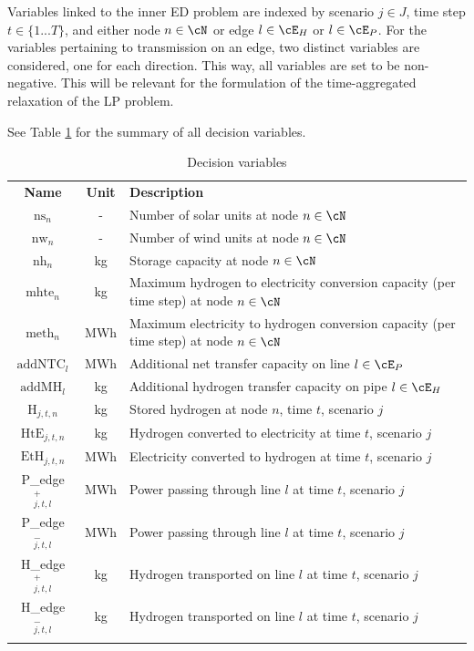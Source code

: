 \documentclass[smallextended,natbib]{svjour3}       %
\numberwithin{theorem}{section}
\begin{document}
Variables linked to the inner ED problem are indexed by scenario \(j\in J\), time step \(t\in\{1...T\}\), and either node \(n \in \cN\) or edge $l\in\cE_H$ or $l \in \cE_P$. 
For the variables pertaining to transmission on an edge, two distinct variables are considered, one for each direction. 
This way, all variables are set to be non-negative. This will be relevant for the formulation of the time-aggregated relaxation of the LP problem.

See Table \ref{table_vars} for the summary of all decision variables.

\begin{table}
  \caption{Decision variables}
  \label{table_vars}
  \begin{tabularx}{\textwidth}{ccl}
  \hline\noalign{\smallskip}
  \textbf{Name} & \textbf{Unit} & \textbf{Description}  \\
  \noalign{\smallskip}\hline\noalign{\smallskip}
  $\text{ns}_n$ & - & Number of solar units at node $n \in \cN$ \\
  $\text{nw}_n$ & - & Number of wind units at node $n \in \cN$ \\
  $\text{nh}_n$ & kg & Storage capacity at node $n \in \cN$\\
  $\text{mhte}_n$ & kg & \parbox[t]{0.70\textwidth}{Maximum hydrogen to electricity conversion capacity (per time step) at node $n \in \cN$} \\
  $\text{meth}_n$ & MWh &  \parbox[t]{0.70\textwidth}{Maximum electricity to hydrogen conversion capacity (per time step) at node $n \in \cN$} \\
  $\text{addNTC}_l$ & MWh & Additional net transfer capacity on line $l\in\cE_P$\\
  $\text{addMH}_l$ & kg & Additional hydrogen transfer capacity on pipe $l\in\cE_H$\\
  \noalign{\smallskip}\hline\noalign{\smallskip}
  $\text{H}_{j,t,n}$ & kg& Stored hydrogen at node $n$, time \(t\), scenario \(j\)\\
  $\text{HtE}_{j,t,n}$ & kg& Hydrogen converted to electricity at time \(t\), scenario \(j\) \\
  $\text{EtH}_{j,t,n}$ & MWh& Electricity converted to hydrogen at time \(t\), scenario \(j\)\\
  P\_edge$^+_{j,t,l}$&MWh& Power passing through line $l$ at time $t$, scenario $j$ \\
  P\_edge$^-_{j,t,l}$&MWh& Power passing through line $l$ at time $t$, scenario $j$ \\
  H\_edge$^+_{j,t,l}$&kg& Hydrogen transported on line $l$ at time $t$, scenario $j$\\
  H\_edge$^-_{j,t,l}$&kg& Hydrogen transported on line $l$ at time $t$, scenario $j$\\
  \noalign{\smallskip}\hline
  \end{tabularx}
  \end{table}
  
\end{document}
